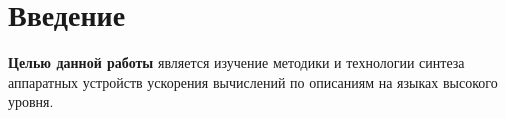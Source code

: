 \chapter*{Введение}

\textbf{Целью данной работы} является изучение методики и технологии синтеза
аппаратных устройств ускорения вычислений по описаниям на языках высокого
уровня. 

